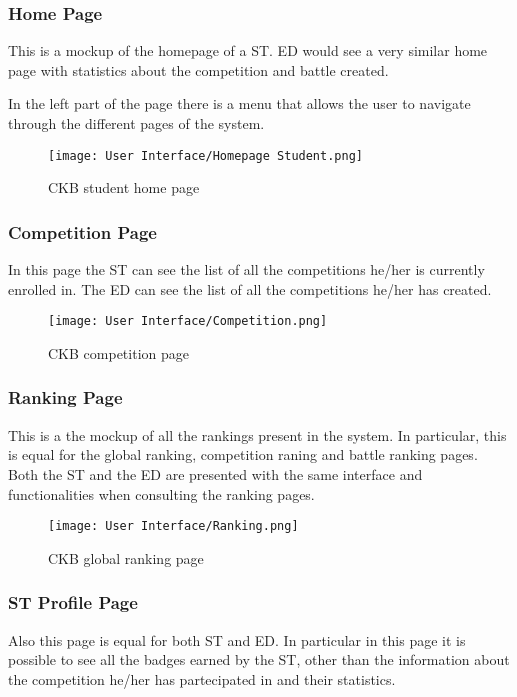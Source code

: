\subsubsection*{Home Page}
\label{ss:home_page}%
This is a mockup of the homepage of a ST. ED would see a very similar home page with statistics about the competition and battle created.

In the left part of the page there is a menu that allows the user to navigate through the different pages of the system.

\begin{figure}[H]
  \centering
  \texttt{[image: User Interface/Homepage Student.png]}
  \caption{CKB student home page}
  \label{fig:homepage}
\end{figure}

\newpage

\subsubsection*{Competition Page}
\label{ss:competition_page}%
In this page the ST can see the list of all the competitions he/her is currently enrolled in. The ED can see the list of all the competitions he/her has created.

\begin{figure}[H]
  \centering
  \texttt{[image: User Interface/Competition.png]}
  \caption{CKB competition page}
  \label{fig:competition}
\end{figure}

\newpage

\subsubsection*{Ranking Page}
\label{ss:ranking_page}%
This is a the mockup of all the rankings present in the system. In particular, this is equal for the global ranking, competition raning and battle ranking pages. Both the ST and the ED are presented with the same interface and functionalities when consulting the ranking pages.

\begin{figure}[H]
  \centering
  \texttt{[image: User Interface/Ranking.png]}
  \caption{CKB global ranking page}
  \label{fig:ranking}
\end{figure}

\newpage

\subsubsection*{ST Profile Page}
\label{ss:ST_profile_page}%
Also this page is equal for both ST and ED. In particular in this page it is possible to see all the badges earned by the ST, other than the information about the competition he/her has partecipated in and their statistics.


